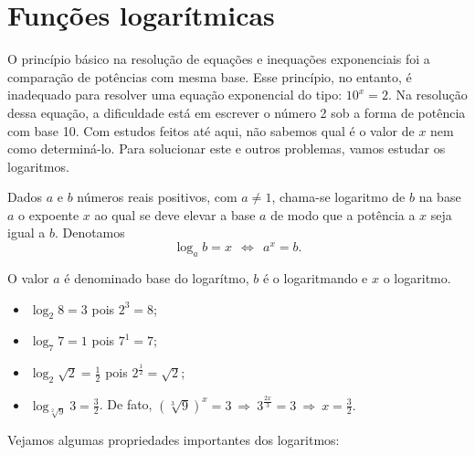  \chapter{Funções logarítmicas}

O princípio básico na resolução de equações e inequações exponenciais foi a comparação de potências com mesma base. Esse princípio, no entanto, é inadequado para resolver uma equação exponencial do tipo: $10^x=2$. Na resolução dessa equação, a dificuldade está em escrever o número 2 sob a forma de potência com base 10. Com estudos feitos até aqui, não sabemos qual é o valor de $x$ nem como determiná-lo. Para solucionar este e outros problemas, vamos estudar os logaritmos.

\begin{obs}
    Dados $a$ e $b$ números reais positivos, com $a\neq 1$, chama-se logaritmo de $b$ na base $a$ o expoente $x$ ao qual se deve elevar a base $a$ de modo que a potência a $x$ seja igual a $b$. Denotamos
    \begin{equation*}
        \log_a b =x \ \ \Leftrightarrow \ \ a^x=b.
    \end{equation*}

    O valor $a$ é denominado base do logarítmo, $b$ é o logaritmando e $x$ o logaritmo.
\end{obs}

\begin{exem}
    \begin{itemize}
        \item $\log_2 8=3$ pois $2^3=8$;
        \item $\log_7 7=1$ pois $7^1=7$;
        \item $\log_2 \sqrt{2}=\frac{1}{2}$ pois $2^{\frac{1}{2}}=\sqrt{2}$;
        \item $\log_{\sqrt[2]{9}} 3=\frac{3}{2}$. De fato, $(\sqrt[3]{9})^x=3 \ \Rightarrow \ 3^{\frac{2x}{3}}=3 \ \Rightarrow \ x = \frac{3}{2}.$
    \end{itemize}
\end{exem}

Vejamos algumas propriedades importantes dos logaritmos:

